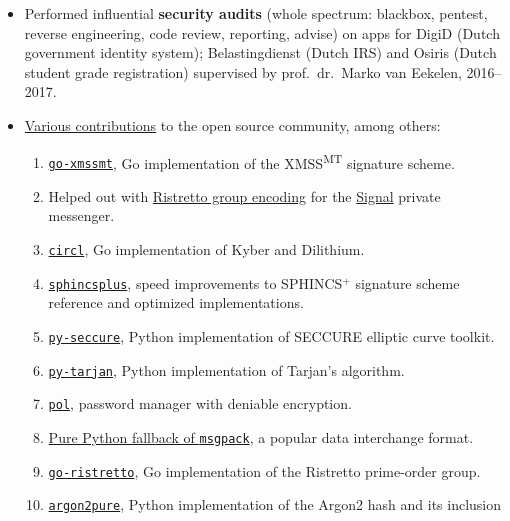 \documentclass{article}
\newcommand\partitle[1]{\vskip20pt\par\noindent{\textsf{\textbf{#1}}}}
\begin{document}
\partitle{Relevant experience}
\begin{itemize}
    \item Performed influential \textbf{security audits} (whole spectrum:
        blackbox, pentest, reverse
        engineering, code review, reporting, advise)
        on apps for DigiD (Dutch government identity system);
        Belastingdienst (Dutch IRS) 
        and Osiris (Dutch student grade registration)
        supervised by prof.~dr.~Marko van Eekelen,
        2016--2017.
    \item \href{https://github.com/bwesterb}{Various contributions} to the open source community, among others:
        \begin{enumerate}
            \item \href{https://github.com/bwesterb/go-xmssmt}{\texttt{go-xmssmt}}, Go implementation of the XMSS\textsuperscript{MT}
                        signature scheme.
                \item Helped out with
        \href{https://github.com/signalapp/curve25519-dalek/commit/c2320e9137ab1d02234620ed4f3b22371f688db2}{Ristretto
                    group encoding} for the \href{https://signal.org/en/}{Signal} private messenger.
            \item \href{https://github.com/cloudflare/circl}{\texttt{circl}}, Go implementation of
                    Kyber and Dilithium.
            \item \href{https://github.com/sphincs/sphincsplus}{\texttt{sphincsplus}},
                    speed improvements to SPHINCS$^+$ signature scheme reference and optimized implementations.
            \item \href{https://github.com/bwesterb/py-seccure}{\texttt{py-seccure}}, Python implementation of SECCURE elliptic curve toolkit.
            \item \href{https://github.com/bwesterb/py-tarjan}{\texttt{py-tarjan}}, Python implementation of Tarjan's algorithm.
            \item \href{https://github.com/bwesterb/pol}{\texttt{pol}}, password manager with deniable encryption.
            \item \href{https://github.com/msgpack/msgpack-python/pull/42}{Pure Python fallback of \texttt{msgpack}}, a popular data interchange format.
            \item \href{https://github.com/bwesterb/go-ristretto}{\texttt{go-ristretto}}, Go implementation of the Ristretto prime-order group.
            \item \href{https://github.com/bwesterb/argon2pure}{\texttt{argon2pure}}, Python implementation of the Argon2 hash and its inclusion

\end{enumerate}
\end{itemize}
\end{document}

